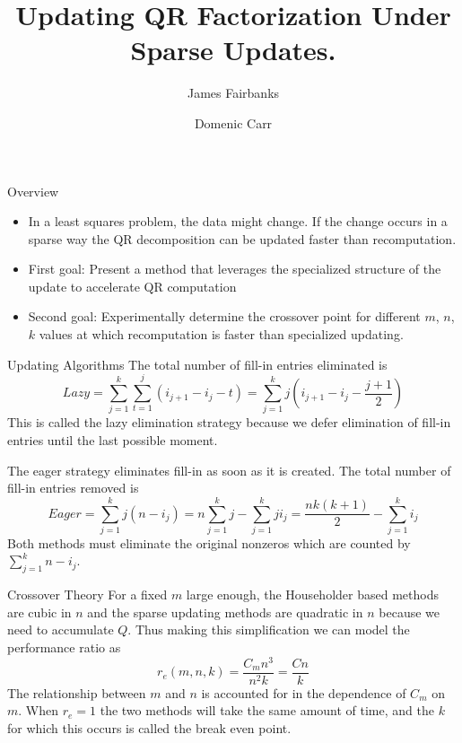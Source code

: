 \documentclass{beamer}
\title{Updating QR Factorization Under Sparse Updates.}
\author{James Fairbanks\inst{1} \and Domenic Carr\inst{2}}
\institute[Georgia Tech] %
{
  \inst{1}%
  School of CSE
  \and
  \inst{2}%
  School of ECE
  }
\begin{document}
\begin{frame}
  \titlepage
\end{frame}


\begin{frame}{Overview}{}
  \begin{itemize}
  \item 
    In a least squares problem, the data might change. If the change occurs in a sparse way the QR decomposition can be updated faster than recomputation.
    \item
    First goal: Present a method that leverages the specialized structure of the update to accelerate QR computation
    \item Second goal: Experimentally determine the crossover point for different $m$, $n$, $k$ values at which recomputation is faster than  specialized updating.
  \end{itemize}
\end{frame}

\begin{frame}{Updating Algorithms} The total number of fill-in entries eliminated is 
\[ Lazy = \sum_{j=1}^k \sum_{t=1}^j (i_{j+1} - i_{j} - t) = \sum_{j=1}^k j(i_{j+1}-i_{j} - \frac{j+1}{2})
\]
This is called the lazy elimination strategy because we defer elimination of fill-in entries until the last possible moment.

The eager strategy eliminates fill-in as soon as it is created. 
The total number of fill-in entries removed is
\[ Eager = \sum_{j=1}^k j(n - i_{j}) = n\sum_{j=1}^k j - \sum_{j=1}^k ji_j = \frac{nk(k+1)}{2} - \sum_{j=1}^k i_j
\]
Both methods must eliminate the original nonzeros which are counted by $\sum_{j=1}^k n-i_j $. 

\end{frame}

\begin{frame}{Crossover Theory} 
For a fixed $m$ large enough, the Householder based methods are cubic in $n$ and the sparse updating methods are quadratic in $n$ because we need to accumulate $Q$. 
Thus making this simplification we can model the performance ratio as
\begin{equation}\label{eqn:model}
    r_e(m,n,k) = \frac{C_m n^3}{n^2k} = \frac{Cn}{k}
\end{equation}
The relationship between $m$ and $n$ is accounted for in the dependence of $C_m$ on $m$.
When $r_e=1$ the two methods will take the same amount of time, and the $k$ for which this occurs is called the break even point.
\end{frame}
\end{document}
